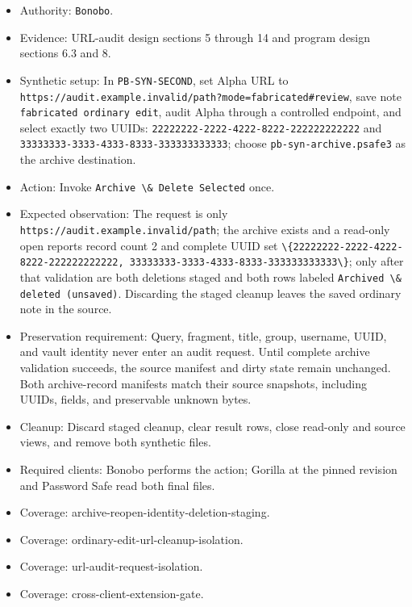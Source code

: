\documentclass[
  letterpaper,
]{article}
\newcommand{\passthrough}[1]{#1}
\providecommand{\tightlist}{%
  \setlength{\itemsep}{0pt}\setlength{\parskip}{0pt}}
\begin{document}
\begin{itemize}
\tightlist
\item
  Authority: \passthrough{\lstinline!Bonobo!}.
\item
  Evidence: URL-audit design sections 5 through 14 and program design sections 6.3 and 8.
\item
  Synthetic setup: In \nolinkurl{PB-SYN-SECOND}, set Alpha URL to
  \nolinkurl{https://audit.example.invalid/path?mode=fabricated#review}, save note
  \passthrough{\lstinline!fabricated ordinary edit!}, audit Alpha through a controlled endpoint, and select exactly two
  UUIDs: \nolinkurl{22222222-2222-4222-8222-222222222222} and \nolinkurl{33333333-3333-4333-8333-333333333333}; choose
  \nolinkurl{pb-syn-archive.psafe3} as the archive destination.
\item
  Action: Invoke \passthrough{\lstinline!Archive \& Delete Selected!} once.
\item
  Expected observation: The request is only \nolinkurl{https://audit.example.invalid/path}; the archive exists and a
  read-only open reports record count 2 and complete UUID set
  \passthrough{\lstinline!\{22222222-2222-4222-8222-222222222222, 33333333-3333-4333-8333-333333333333\}!}; only after
  that validation are both deletions staged and both rows labeled
  \passthrough{\lstinline!Archived \& deleted (unsaved)!}. Discarding the staged cleanup leaves the saved ordinary note
  in the source.
\item
  Preservation requirement: Query, fragment, title, group, username, UUID, and vault identity never enter an audit
  request. Until complete archive validation succeeds, the source manifest and dirty state remain unchanged. Both
  archive-record manifests match their source snapshots, including UUIDs, fields, and preservable unknown bytes.
\item
  Cleanup: Discard staged cleanup, clear result rows, close read-only and source views, and remove both synthetic files.
\item
  Required clients: Bonobo performs the action; Gorilla at the pinned revision and Password Safe read both final files.
\item
  Coverage: archive-reopen-identity-deletion-staging.
\item
  Coverage: ordinary-edit-url-cleanup-isolation.
\item
  Coverage: url-audit-request-isolation.
\item
  Coverage: cross-client-extension-gate.
\end{itemize}
\end{document}
